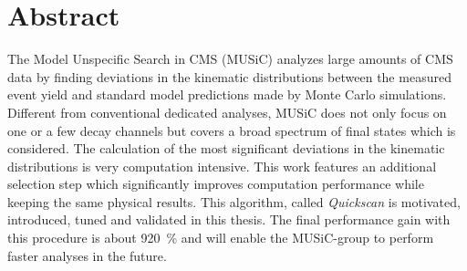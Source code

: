 
\chapter*{Abstract}
The Model Unspecific Search in CMS (MUSiC) analyzes large amounts of CMS data by finding deviations in the kinematic distributions between the measured event yield and standard model predictions made by Monte Carlo simulations. Different from conventional dedicated analyses, MUSiC does not only focus on one or a few decay channels but covers a broad spectrum of final states which is considered. 
The calculation of the most significant deviations in the kinematic distributions is very computation intensive. This work features an additional selection step which significantly improves computation performance while keeping the same physical results.
This algorithm, called \emph{Quickscan} is motivated, introduced, tuned and validated in this thesis. The final performance gain with this procedure is about \SI{920}{\percent} and will enable the MUSiC-group to perform faster analyses in the future.
